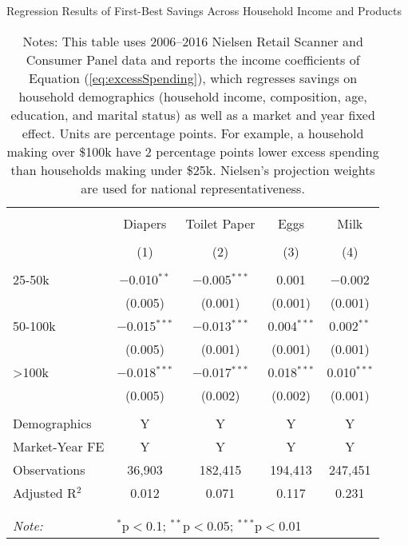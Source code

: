 
\begin{table}[!htbp] \centering
  \caption{Regression Results of First-Best Savings Across Household Income and Products}
  \label{tab:lowestPrice}
\begin{tabular}{@{\extracolsep{5pt}}lcccc}
\\[-1.8ex]\hline
\hline \\[-1.8ex]
 & Diapers & Toilet Paper & Eggs & Milk \\
\\[-1.8ex] & (1) & (2) & (3) & (4)\\
\hline \\[-1.8ex]
 25-50k & $-$0.010$^{**}$ & $-$0.005$^{***}$ & 0.001 & $-$0.002 \\
  & (0.005) & (0.001) & (0.001) & (0.001) \\
  50-100k & $-$0.015$^{***}$ & $-$0.013$^{***}$ & 0.004$^{***}$ & 0.002$^{**}$ \\
  & (0.005) & (0.001) & (0.001) & (0.001) \\
  >100k & $-$0.018$^{***}$ & $-$0.017$^{***}$ & 0.018$^{***}$ & 0.010$^{***}$ \\
  & (0.005) & (0.002) & (0.002) & (0.001) \\
 \hline \\[-1.8ex]
Demographics & Y & Y & Y & Y \\
Market-Year FE & Y & Y & Y & Y \\
Observations & 36,903 & 182,415 & 194,413 & 247,451 \\
Adjusted R$^{2}$ & 0.012 & 0.071 & 0.117 & 0.231 \\
\\[-1.8ex]\hline
\hline \\[-1.8ex]
\textit{Note:}  & \multicolumn{4}{l}{$^{*}$p$<$0.1; $^{**}$p$<$0.05; $^{***}$p$<$0.01} \\
\end{tabular}
\caption*{Notes: This table uses 2006--2016 Nielsen Retail Scanner and Consumer Panel data and reports the income coefficients of Equation (\ref{eq:excessSpending}), which regresses savings on household demographics (household income, composition, age, education, and marital status) as well as a market and year fixed effect. Units are percentage points. For example, a household making over \$100k have 2 percentage points lower excess spending than households making under \$25k. Nielsen's projection weights are used for national representativeness.}
\end{table}
